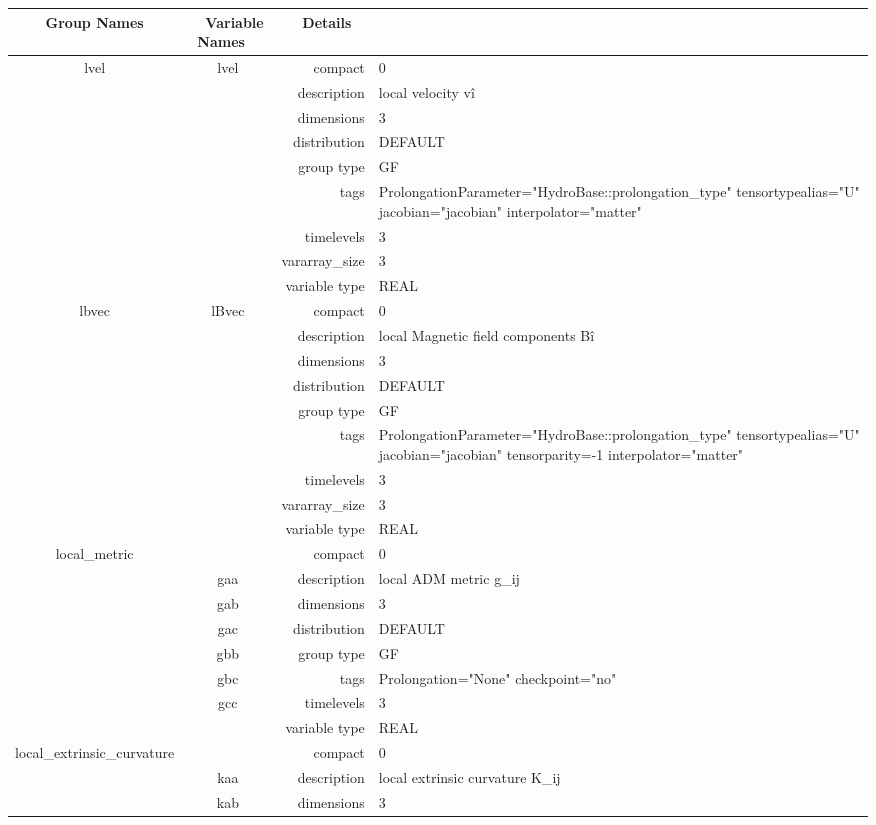 \begin{tabular*}{150mm}{|c|c@{\extracolsep{\fill}}|rl|} \hline 
~ {\bf Group Names} ~ & ~ {\bf Variable Names} ~  &{\bf Details} ~ & ~ \\ 
\hline 
lvel & lvel & compact & 0 \\ 
 &  & description & local velocity v\^i \\ 
 &  & dimensions & 3 \\ 
 &  & distribution & DEFAULT \\ 
 &  & group type & GF \\ 
 &  & tags & ProlongationParameter="HydroBase::prolongation\_type" tensortypealias="U" jacobian="jacobian" interpolator="matter" \\ 
 &  & timelevels & 3 \\ 
 &  & vararray\_size & 3 \\ 
 &  & variable type & REAL \\ 
\hline 
lbvec & lBvec & compact & 0 \\ 
 &  & description & local Magnetic field components B\^i \\ 
 &  & dimensions & 3 \\ 
 &  & distribution & DEFAULT \\ 
 &  & group type & GF \\ 
 &  & tags & ProlongationParameter="HydroBase::prolongation\_type" tensortypealias="U" jacobian="jacobian" tensorparity=-1 interpolator="matter" \\ 
 &  & timelevels & 3 \\ 
 &  & vararray\_size & 3 \\ 
 &  & variable type & REAL \\ 
\hline 
local\_metric &  & compact & 0 \\ 
 & gaa & description & local ADM metric g\_ij \\ 
 & gab & dimensions & 3 \\ 
 & gac & distribution & DEFAULT \\ 
 & gbb & group type & GF \\ 
 & gbc & tags & Prolongation="None" checkpoint="no" \\ 
 & gcc & timelevels & 3 \\ 
 &  & variable type & REAL \\ 
\hline 
local\_extrinsic\_curvature &  & compact & 0 \\ 
 & kaa & description & local extrinsic curvature K\_ij \\ 
 & kab & dimensions & 3 \\ 

\end{tabular*}
